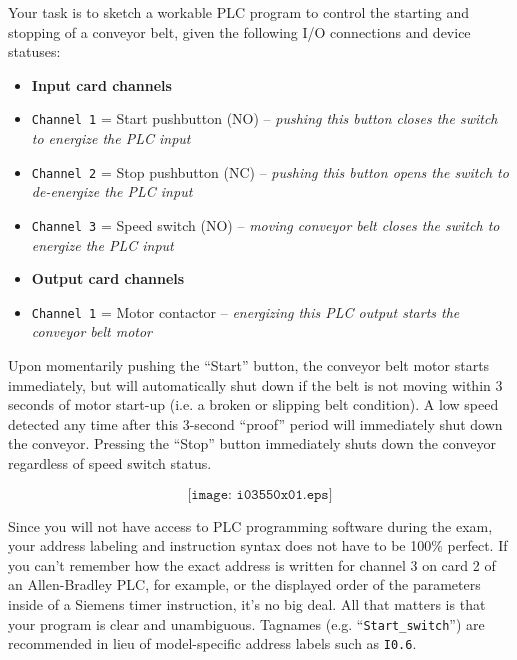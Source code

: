 

Your task is to sketch a workable PLC program to control the starting and stopping of a conveyor belt, given the following I/O connections and device statuses:

\begin{itemize}
\item{} {\bf Input card channels} 
\item{} {\tt Channel 1} = Start pushbutton (NO) -- {\it pushing this button closes the switch to energize the PLC input}
\item{} {\tt Channel 2} = Stop pushbutton (NC) -- {\it pushing this button opens the switch to de-energize the PLC input}
\item{} {\tt Channel 3} = Speed switch (NO) -- {\it moving conveyor belt closes the switch to energize the PLC input}
\end{itemize}

\begin{itemize}
\item{} {\bf Output card channels} 
\item{} {\tt Channel 1} = Motor contactor -- {\it energizing this PLC output starts the conveyor belt motor}
\end{itemize}

\vskip 10pt

Upon momentarily pushing the ``Start'' button, the conveyor belt motor starts immediately, but will automatically shut down if the belt is not moving within 3 seconds of motor start-up (i.e. a broken or slipping belt condition).  A low speed detected any time after this 3-second ``proof'' period will immediately shut down the conveyor.  Pressing the ``Stop'' button immediately shuts down the conveyor regardless of speed switch status.

$$\texttt{[image: i03550x01.eps]}$$

Since you will not have access to PLC programming software during the exam, your address labeling and instruction syntax does not have to be 100\% perfect.  If you can't remember how the exact address is written for channel 3 on card 2 of an Allen-Bradley PLC, for example, or the displayed order of the parameters inside of a Siemens timer instruction, it's no big deal.  All that matters is that your program is clear and unambiguous.  Tagnames (e.g. ``{\tt Start\_switch}'') are recommended in lieu of model-specific address labels such as {\tt I0.6}.

